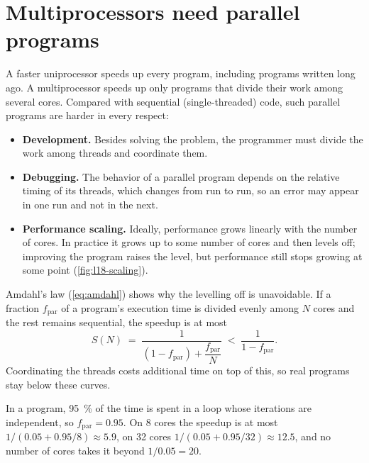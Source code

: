 \documentclass[../main.tex]{subfiles}
\begin{document}
\section{Multiprocessors need parallel programs}
\label{sec:l18-parallel-programs}

A faster uniprocessor speeds up every program, including programs written
long ago.  A multiprocessor speeds up only programs that divide their work
among several cores.  Compared with
sequential (single-threaded) code, such parallel programs are harder in
every respect:
\begin{itemize}
  \item \textbf{Development.}  Besides solving the problem, the programmer
    must divide the work among threads and coordinate them.
  \item \textbf{Debugging.}  The behavior of a parallel program depends on
    the relative timing of its threads, which changes from run to run, so an
    error may appear in one run and not in the next.
  \item \textbf{Performance scaling.}  Ideally, performance grows linearly
    with the number of cores.  In practice it grows up to some number of
    cores and then levels off; improving the program raises the level, but
    performance still stops growing at some point (\cref{fig:l18-scaling}).
\end{itemize}

\begin{marginfigure}
  \resizebox{\linewidth}{!}{}
  \caption{Speedup on $N$ cores: ideal scaling and
    \cref{eq:l18-amdahl-cores}.}
  \label{fig:l18-scaling}
\end{marginfigure}
Amdahl's law (\cref{eq:amdahl}) shows why the levelling off is
unavoidable.  If a fraction $f_{\mathrm{par}}$ of a program's execution
time is divided evenly among $N$ cores and the rest remains sequential, the
speedup is at most
\begin{equation}
  S(N) \;=\; \frac{1}{(1-f_{\mathrm{par}}) + \dfrac{f_{\mathrm{par}}}{N}}
  \;<\; \frac{1}{1-f_{\mathrm{par}}} .
  \label{eq:l18-amdahl-cores}
\end{equation}
Coordinating the threads costs additional time on top of this, so real
programs stay below these curves.

\begin{example}
  In a program, \SI{95}{\percent} of the time is spent in a loop whose
  iterations are independent, so $f_{\mathrm{par}}=0.95$.  On 8 cores the speedup is at
  most $1/(0.05+0.95/8)\approx 5.9$, on 32 cores
  $1/(0.05+0.95/32)\approx 12.5$, and no number of cores takes it beyond
  $1/0.05 = 20$.
\end{example}
\end{document}
